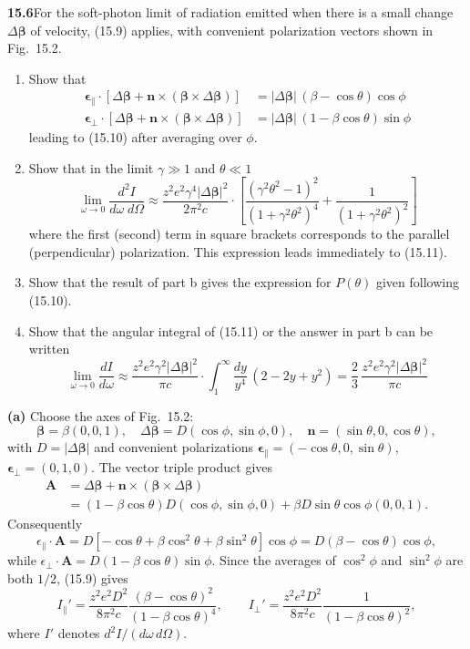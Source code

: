 \par\bigskip
\noindent\textbf{15.6}\quad For the soft-photon limit of radiation emitted when there is a small change $\Delta\boldsymbol{\beta}$ of velocity, (15.9) applies, with convenient polarization vectors shown in Fig.~15.2.
\begin{enumerate}
\item[(a)] Show that
\begin{align*}
\boldsymbol{\epsilon}_{\parallel}\cdot[\Delta\boldsymbol{\beta}+\mathbf{n}\times(\boldsymbol{\beta}\times\Delta\boldsymbol{\beta})]&=|\Delta\boldsymbol{\beta}|\,(\beta-\cos\theta)\cos\phi\\[4pt]
\boldsymbol{\epsilon}_{\perp}\cdot[\Delta\boldsymbol{\beta}+\mathbf{n}\times(\boldsymbol{\beta}\times\Delta\boldsymbol{\beta})]&=|\Delta\boldsymbol{\beta}|\,(1-\beta\cos\theta)\sin\phi
\end{align*}
leading to (15.10) after averaging over $\phi$.
\item[(b)] Show that in the limit $\gamma\gg1$ and $\theta\ll1$
\[
\lim_{\omega\to0}\frac{d^{2}I}{d\omega\;d\Omega}\approx\frac{z^{2}e^{2}\gamma^{4}|\Delta\boldsymbol{\beta}|^{2}}{2\pi^{2}c}\cdot\left[\frac{(\gamma^{2}\theta^{2}-1)^{2}}{(1+\gamma^{2}\theta^{2})^{4}}+\frac{1}{(1+\gamma^{2}\theta^{2})^{2}}\right]
\]
where the first (second) term in square brackets corresponds to the parallel (perpendicular) polarization. This expression leads immediately to (15.11).
\item[(c)] Show that the result of part b gives the expression for $P(\theta)$ given following (15.10).
\item[(d)] Show that the angular integral of (15.11) or the answer in part b can be written
\[
\lim_{\omega\to0}\frac{dI}{d\omega}\approx\frac{z^{2}e^{2}\gamma^{2}|\Delta\boldsymbol{\beta}|^{2}}{\pi c}\cdot\int_{1}^{\infty}\frac{dy}{y^{4}}\,(2-2y+y^{2})=\frac{2}{3}\,\frac{z^{2}e^{2}\gamma^{2}|\Delta\boldsymbol{\beta}|^{2}}{\pi c}
\]
\end{enumerate}
\solution

\medskip\noindent\textbf{(a)} Choose the axes of Fig.~15.2:
\[
\boldsymbol\beta=\beta(0,0,1),\quad
\Delta\boldsymbol\beta=D(\cos\phi,\sin\phi,0),\quad
\mathbf n=(\sin\theta,0,\cos\theta),
\]
with $D=|\Delta\boldsymbol\beta|$ and convenient polarizations
$\boldsymbol\epsilon_\parallel=(-\cos\theta,0,\sin\theta)$,
$\boldsymbol\epsilon_\perp=(0,1,0)$.
The vector triple product gives
\begin{align*}
\mathbf A&=\Delta\boldsymbol\beta+
\mathbf n\times(\boldsymbol\beta\times\Delta\boldsymbol\beta)\\
&=(1-\beta\cos\theta)D(\cos\phi,\sin\phi,0)
 +\beta D\sin\theta\cos\phi(0,0,1).
\end{align*}
Consequently
\[
\epsilon_\parallel\cdot\mathbf A
=D[-\cos\theta+\beta\cos^2\theta+\beta\sin^2\theta]\cos\phi
=D(\beta-\cos\theta)\cos\phi,
\]
while $\epsilon_\perp\cdot\mathbf A
=D(1-\beta\cos\theta)\sin\phi$.
Since the averages of $\cos^2\phi$ and $\sin^2\phi$ are both $1/2$,
(15.9) gives
\[
I_\parallel'=\frac{z^2e^2D^2}{8\pi^2c}
 \frac{(\beta-\cos\theta)^2}{(1-\beta\cos\theta)^4},\qquad
I_\perp'=\frac{z^2e^2D^2}{8\pi^2c}
 \frac1{(1-\beta\cos\theta)^2},
\]
where $I'$ denotes $d^2I/(d\omega\,d\Omega)$.

